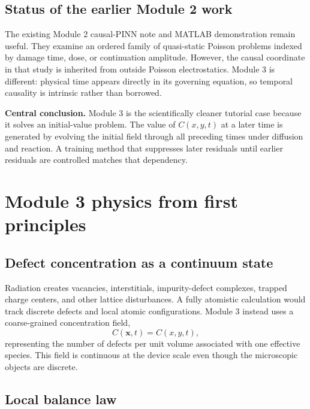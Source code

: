 \documentclass[11pt]{article}
\newcommand{\xv}{\bm{x}}
\begin{document}
\subsection{Status of the earlier Module 2 work}

The existing Module 2 causal-PINN note and MATLAB demonstration remain useful. They examine an ordered family of quasi-static Poisson problems indexed by damage time, dose, or continuation amplitude. However, the causal coordinate in that study is inherited from outside Poisson electrostatics. Module 3 is different: physical time appears directly in its governing equation, so temporal causality is intrinsic rather than borrowed.

\begin{physicsbox}
\textbf{Central conclusion.} Module 3 is the scientifically cleaner tutorial case because it solves an initial-value problem. The value of $C(x,y,t)$ at a later time is generated by evolving the initial field through all preceding times under diffusion and reaction. A training method that suppresses later residuals until earlier residuals are controlled matches that dependency.
\end{physicsbox}

\section{Module 3 physics from first principles}

\subsection{Defect concentration as a continuum state}

Radiation creates vacancies, interstitials, impurity-defect complexes, trapped charge centers, and other lattice disturbances. A fully atomistic calculation would track discrete defects and local atomic configurations. Module 3 instead uses a coarse-grained concentration field,
\begin{equation}
C(\xv,t)=C(x,y,t),
\end{equation}
representing the number of defects per unit volume associated with one effective species. This field is continuous at the device scale even though the microscopic objects are discrete.

\subsection{Local balance law}
\end{document}
